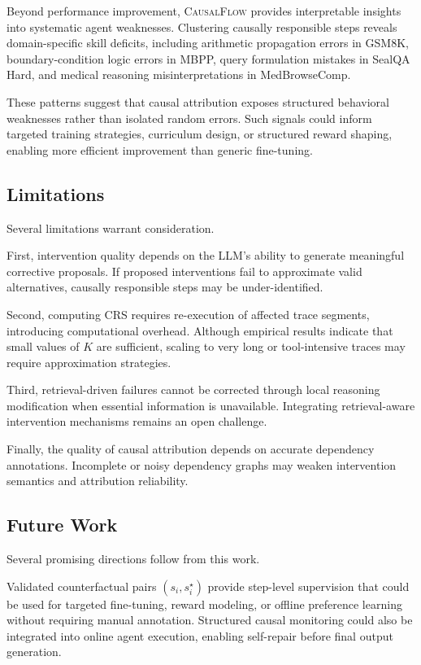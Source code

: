 \documentclass{article}
\theoremstyle{plain}
\theoremstyle{definition}
\theoremstyle{remark}
\begin{document}
Beyond performance improvement, \textsc{CausalFlow} provides interpretable insights into systematic agent weaknesses. Clustering causally responsible steps reveals domain-specific skill deficits, including arithmetic propagation errors in GSM8K, boundary-condition logic errors in MBPP, query formulation mistakes in SealQA Hard, and medical reasoning misinterpretations in MedBrowseComp.

These patterns suggest that causal attribution exposes structured behavioral weaknesses rather than isolated random errors. Such signals could inform targeted training strategies, curriculum design, or structured reward shaping, enabling more efficient improvement than generic fine-tuning.

\subsection{Limitations}

Several limitations warrant consideration.

First, intervention quality depends on the LLM’s ability to generate meaningful corrective proposals. If proposed interventions fail to approximate valid alternatives, causally responsible steps may be under-identified.

Second, computing CRS requires re-execution of affected trace segments, introducing computational overhead. Although empirical results indicate that small values of $K$ are sufficient, scaling to very long or tool-intensive traces may require approximation strategies.

Third, retrieval-driven failures cannot be corrected through local reasoning modification when essential information is unavailable. Integrating retrieval-aware intervention mechanisms remains an open challenge.

Finally, the quality of causal attribution depends on accurate dependency annotations. Incomplete or noisy dependency graphs may weaken intervention semantics and attribution reliability.

\subsection{Future Work}

Several promising directions follow from this work.

Validated counterfactual pairs $(s_i, s_i^\star)$ provide step-level supervision that could be used for targeted fine-tuning, reward modeling, or offline preference learning without requiring manual annotation. Structured causal monitoring could also be integrated into online agent execution, enabling self-repair before final output generation.
\end{document}
